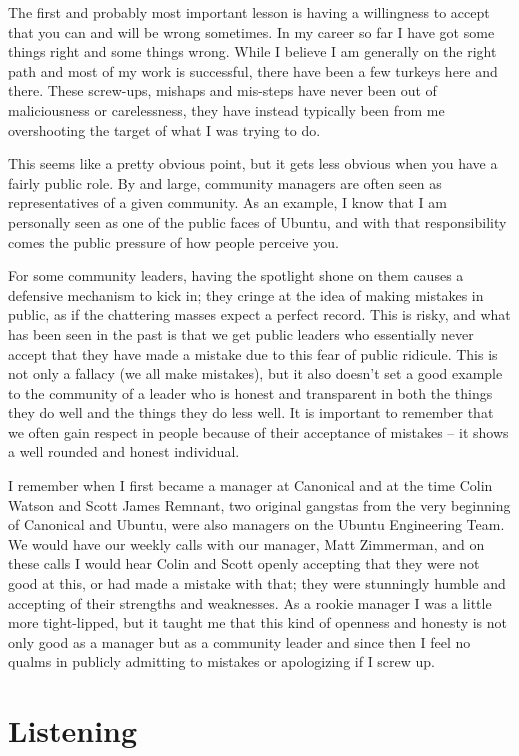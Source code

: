 The first and probably most important lesson is having a willingness to accept that you can and will be wrong sometimes. In my career so far I have got some things right and some things wrong. While I believe I am generally on the right path and most of my work is successful, there have been a few turkeys here and there. These screw-ups, mishaps and mis-steps have never been out of maliciousness or carelessness, they have instead typically been from me overshooting the target of what I was trying to do.

This seems like a pretty obvious point, but it gets less obvious when you have a fairly public role. By and large, community managers are often seen as representatives of a given community. As an example, I know that I am personally seen as one of the public faces of Ubuntu, and with that responsibility comes the public pressure of how people perceive you.

For some community leaders, having the spotlight shone on them causes a defensive mechanism to kick in; they cringe at the idea of making mistakes in public, as if the chattering masses expect a perfect record. This is risky, and what has been seen in the past is that we get public leaders who essentially never accept that they have made a mistake due to this fear of public ridicule. This is not only a fallacy (we all make mistakes), but it also doesn’t set a good example to the community of a leader who is honest and transparent in both the things they do well and the things they do less well. It is important to remember that we often gain respect in people because of their acceptance of mistakes – it shows a well rounded and honest individual.

I remember when I first became a manager at Canonical and at the time Colin Watson and Scott James Remnant, two original gangstas from the very beginning of Canonical and Ubuntu, were also managers on the Ubuntu Engineering Team. We would have our weekly calls with our manager, Matt Zimmerman, and on these calls I would hear Colin and Scott openly accepting that they were not good at this, or had made a mistake with that; they were stunningly humble and accepting of their strengths and weaknesses. As a rookie manager I was a little more tight-lipped, but it taught me that this kind of openness and honesty is not only good as a manager but as a community leader and since then I feel no qualms in publicly admitting to mistakes or apologizing if I screw up.

\section*{Listening}


